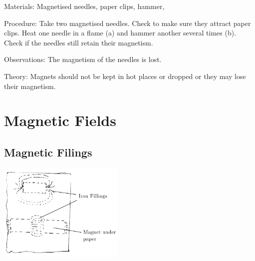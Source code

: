 \begin{multicols}{2}
\begin{description*}
\item[Materials:]{Magnetised needles, paper clips, hammer, }
\item[Procedure:]{Take two magnetised needles. Check to make sure they attract paper clips. Heat one needle in a flame (a) and hammer another several times (b). Check if the needles still retain their
magnetism.}
\item[Observations:]{The magnetism of the needles is lost.}
\item[Theory:]{Magnets should not be kept in hot places or dropped or they may lose their
magnetism.}
\end{description*}


\section*{Magnetic Fields}


\subsection{Magnetic Filings}

\begin{center}
\includegraphics[width=0.45\textwidth]{./img/magnetic-fields.png}
\end{center}


\end{multicols}

